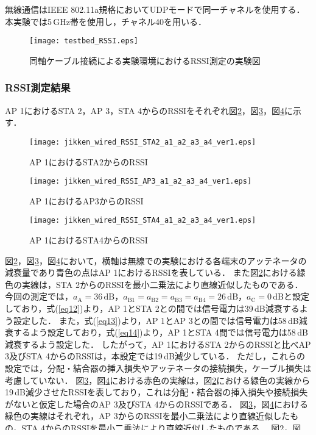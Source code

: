 \documentclass[master]{kuisthesis}		%
\begin{document}
無線通信はIEEE 802.11a規格においてUDPモードで同一チャネルを使用する．
本実験では5\,GHz帯を使用し，チャネル40を用いる．
\ifnum {}
\begin{figure}[!t]
\centering
\texttt{[image: testbed\_RSSI.eps]}
\caption{同軸ケーブル接続による実験環境におけるRSSI測定の実験図}
\label{r_mesure}
\end{figure}
\fi

\subsubsection{RSSI測定結果}\label{RSSI}
AP 1におけるSTA 2，AP 3，STA 4からのRSSIをそれぞれ図\ref{STA2_RSSI}，図\ref{AP3_RSSI}，図\ref{STA4_RSSI}に示す．
\ifnum {}
\begin{figure}
\centering
\texttt{[image: jikken\_wired\_RSSI\_STA2\_a1\_a2\_a3\_a4\_ver1.eps]}
\caption{AP 1におけるSTA2からのRSSI}
\label{STA2_RSSI}
\end{figure}
\fi
\ifnum {}
\begin{figure}[!t]
\centering
\texttt{[image: jikken\_wired\_RSSI\_AP3\_a1\_a2\_a3\_a4\_ver1.eps]}
\caption{AP 1におけるAP3からのRSSI}
\label{AP3_RSSI}
\end{figure}
\fi
\ifnum {}
\begin{figure}[!t]
\centering
\texttt{[image: jikken\_wired\_RSSI\_STA4\_a1\_a2\_a3\_a4\_ver1.eps]}
\caption{AP 1におけるSTA4からのRSSI}
\label{STA4_RSSI}
\end{figure}
\fi
図\ref{STA2_RSSI}，図\ref{AP3_RSSI}，図\ref{STA4_RSSI}において，横軸は無線での実験における各端末のアッテネータの減衰量であり青色の点はAP 1におけるRSSIを表している．
また図\ref{STA2_RSSI}における緑色の実線は，STA 2からのRSSIを最小二乗法により直線近似したものである．
今回の測定では，$a_\mathrm{A} = 36\,\mathrm{dB}$，$a_\mathrm{B1} = a_\mathrm{B2} =a_\mathrm{B3} =a_\mathrm{B4} = 26\,\mathrm{dB}$，$a_\mathrm{C} = 0\,\mathrm{dB}$と設定しており，式(\ref{eq12})より，AP 1とSTA 2との間では信号電力は39\,dB減衰するよう設定した．
また，式(\ref{eq13})より，AP 1とAP 3との間では信号電力は58\,dB減衰するよう設定しており，式(\ref{eq14})より，AP 1とSTA 4間では信号電力は58\,dB減衰するよう設定した．
したがって，AP 1におけるSTA 2からのRSSIと比べAP 3及びSTA 4からのRSSIは，本設定では19\,dB減少している．
ただし，これらの設定では，分配・結合器の挿入損失やアッテネータの接続損失，ケーブル損失は考慮していない．
図\ref{AP3_RSSI}，図\ref{STA4_RSSI}における赤色の実線は，図\ref{STA2_RSSI}における緑色の実線から19\,dB減少させたRSSIを表しており，これは分配・結合器の挿入損失や接続損失がないと仮定した場合のAP 3及びSTA 4からのRSSIである．
図\ref{AP3_RSSI}，図\ref{STA4_RSSI}における緑色の実線はそれぞれ，AP 3からのRSSIを最小二乗法により直線近似したもの，STA 4からのRSSIを最小二乗法により直線近似したものである．
図\ref{STA2_RSSI}，図\ref{AP3_RSSI}，図\ref{STA4_RSSI}から，アッテネータの減衰量を増加させると，増加させた減衰量だけRSSIが減少していることがわかる．
またAP 3及びSTA 4からのRSSIは，AP 1からのRSSIと比べ設定した減衰量よりさらに10\,dB減少していることがわかる．
想定よりRSSIが減少している理由として，分配・結合器の挿入損失やアッテネータの接続損失，ケーブル損失などの影響が挙げられる．
\end{document}
